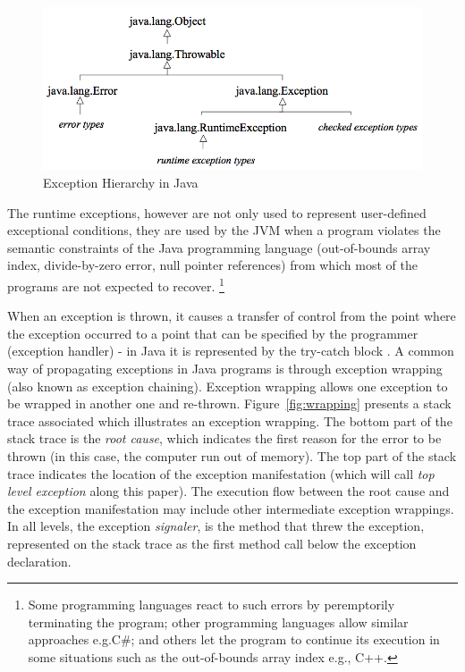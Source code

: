 \documentclass[conference]{IEEEtran}
\begin{document}
\begin{figure} \centering \includegraphics[width=\hsize]{new2_hierarchy.png}
  \caption{Exception Hierarchy in Java} \label{fig:exchier} \end{figure}

The runtime exceptions, however are not only used to represent user-defined
exceptional conditions, they are used by the JVM when a program violates 
the semantic constraints of the Java programming language (out-of-bounds array index, divide-by-zero 
error, null pointer references) from which most of the programs are not expected to recover. 
\footnote{Some programming languages react to such errors by peremptorily terminating the program; 
other programming languages allow similar approaches e.g.C\#; and others let the program to continue
 its execution in some situations such as the out-of-bounds array index e.g., C++. }


When an exception is thrown, it causes a transfer of control from the point
where the exception occurred to a point that can be specified by the programmer
(exception handler) - in Java it is represented by the try-catch block . A common way of  
propagating exceptions in Java programs is through exception wrapping
 (also known as exception chaining). Exception wrapping allows one exception 
to be wrapped in another one and re-thrown. Figure~\ref{fig:wrapping} presents 
a stack trace associated which illustrates an exception wrapping. The bottom 
part of the stack trace is the \emph{root cause}, which indicates the
first reason for the error to be thrown (in this case, the computer run out of
memory). The top part of the stack trace indicates the location of the exception
manifestation (which will call \emph{top level exception} along this paper). The
execution flow  between the root cause and the exception manifestation may
include other intermediate exception wrappings. In all levels, the exception
\emph{signaler}, is the method that threw the exception, represented on the
stack trace as the first method call below the exception declaration.
\end{document}
